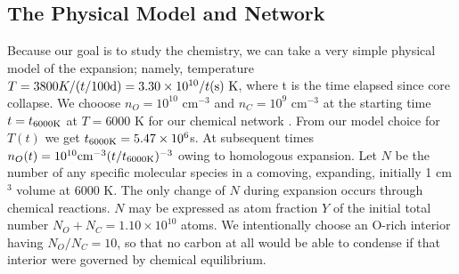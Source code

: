 \documentclass[manuscript]{aastex}
\begin{document}
\begin{CJK*}{UTF8}{gbsn}
\section{The Physical Model and Network}

Because our goal is to study the chemistry, we can take a very simple physical
model of the expansion; namely, temperature
$T = 3800 K / (t / 100 {\rm d}) =
3.30 \times 10^{10} / t({\rm s})\ {\rm K}$,
where t is the time elapsed since core collapse.
We chooose $n_O = 10^{10}$ cm$^{-3}$
and $n_C = 10^9$ cm$^{-3}$
at the starting time $t = t_{6000 {\rm K} }$ 
at $T=6000$ K for our chemical network . From our model choice for $T(t)$ we get
$t_{6000 {\rm K} } = 5.47 \times 10^6$s. At
subsequent times $n_O(t) = 10^{10}{\rm cm}^{-3}(t/t_{6000 {\rm K}})^{-3}$
owing to homologous expansion.
Let $N$ be the number of any specific molecular species
in a comoving, expanding, initially 1 cm$^3$ volume at 6000 K.
The only change of $N$ during
expansion occurs through chemical reactions. $N$ may be expressed as atom
fraction $Y$ of the initial total number
$N_O + N_C = 1.10 \times 10^{10}$ atoms. We
intentionally choose an O-rich interior having $N_O/N_C = 10$,
so that no carbon at
all would be able to condense if that interior were governed by chemical
equilibrium. 


\end{CJK*}
\end{document}
